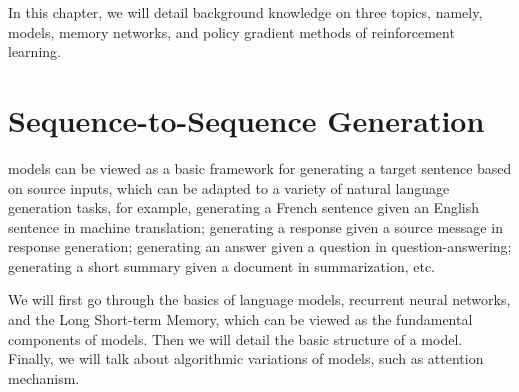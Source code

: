 In this chapter, we will detail background knowledge on three topics,
namely, \sts models, memory networks, and policy gradient methods of reinforcement learning. 

\section{Sequence-to-Sequence Generation}
\sts models can be viewed as a basic framework for generating a target sentence based on source inputs, which can be adapted to 
a variety of natural language generation tasks,
for example, 
generating a French sentence given an English sentence in machine translation; 
generating a response given a source message in response generation;
generating an answer given a question in question-answering;
generating a short summary given a document in summarization, etc.  

We will first go through the basics of language models, recurrent neural networks, and the Long Short-term Memory, which 
can be viewed as the fundamental components of \sts models. Then we will detail the basic structure of a \sts model. Finally, we will talk about  
 algorithmic  variations of \sts models, such as attention mechanism. 
